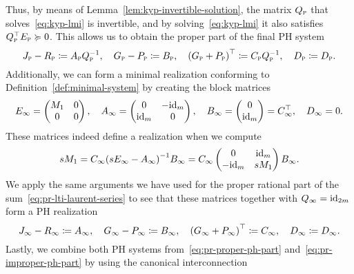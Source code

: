 Thus, by means of Lemma~\ref{lem:kyp-invertible-solution}, the matrix $Q_\msc{p}$ that solves~\eqref{eq:kyp-lmi} is invertible, and by solving~\eqref{eq:kyp-lmi} it also satisfies $Q_\msc{p}\trans E_\msc{p} \succcurlyeq 0$.
This allows us to obtain the proper part of the final \ac{PH} system
\begin{equation}\label{eq:pr-proper-ph-part}
    J_\msc{p} - R_\msc{p} \coloneqq A_\msc{p} Q_\msc{p}\inv,\quad G_\msc{p} - P_\msc{p} \coloneqq B_\msc{p},\quad {(G_\msc{p} + P_\msc{p})}\trans \coloneqq C_\msc{p} Q_\msc{p}\inv,\quad D_\msc{p} \coloneqq D_\msc{p}.
\end{equation}
Additionally, we can form a minimal realization conforming to Definition~\ref{def:minimal-system} by creating the block matrices
\begin{equation*}
    E_\infty = \begin{pmatrix}
        M_1 & 0 \\
        0 & 0
    \end{pmatrix},\quad A_\infty = \begin{pmatrix}
        0 & -\id[m] \\
        \id[m] & 0
    \end{pmatrix},\quad B_\infty = \begin{pmatrix}
        0 \\
        \id[m]
    \end{pmatrix} = C_\infty\trans,\quad D_\infty = 0.
\end{equation*}
These matrices indeed define a realization when we compute
\begin{equation*}
    s M_1 = C_\infty {(s E_\infty - A_\infty)}\inv B_\infty = C_\infty \begin{pmatrix}
        0 & \id[m] \\
        -\id[m] & s M_1
    \end{pmatrix} B_\infty.
\end{equation*}
We apply the same arguments we have used for the proper rational part of the sum~\eqref{eq:pr-lti-laurent-series} to see that these matrices together with $Q_\infty = \id[2m]$ form a \ac{PH} realization
\begin{equation}\label{eq:pr-improper-ph-part}
    J_\infty - R_\infty \coloneqq A_\infty,\quad G_\infty - P_\infty \coloneqq B_\infty,\quad {(G_\infty + P_\infty)}\trans \coloneqq C_\infty,\quad D_\infty \coloneqq D_\infty.
\end{equation}
Lastly, we combine both \ac{PH} systems from~\eqref{eq:pr-proper-ph-part} and~\eqref{eq:pr-improper-ph-part} by using the canonical interconnection
